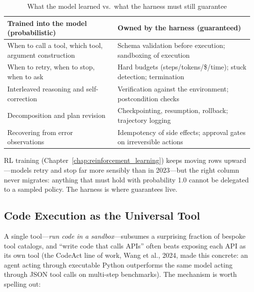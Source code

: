 \begin{table}[H]
\centering
\caption{What the model learned vs.\ what the harness must still guarantee}
\label{tab:model_vs_harness}
\begin{tabularx}{\textwidth}{XX}
\toprule
\textbf{Trained into the model (probabilistic)} & \textbf{Owned by the harness (guaranteed)} \\
\midrule
When to call a tool, which tool, argument construction & Schema validation before execution; sandboxing of execution \\
When to retry, when to stop, when to ask & Hard budgets (steps/tokens/\$/time); stuck detection; termination \\
Interleaved reasoning and self-correction & Verification against the environment; postcondition checks \\
Decomposition and plan revision & Checkpointing, resumption, rollback; trajectory logging \\
Recovering from error observations & Idempotency of side effects; approval gates on irreversible actions \\
\bottomrule
\end{tabularx}
\end{table}

RL training (Chapter~\ref{chap:reinforcement_learning}) keeps moving rows upward---models retry and stop far more sensibly than in 2023---but the right column never migrates: anything that must hold with probability 1.0 cannot be delegated to a sampled policy. The harness is where guarantees live.

\subsection{Code Execution as the Universal Tool}

A single tool---\textit{run code in a sandbox}---subsumes a surprising fraction of bespoke tool catalogs, and ``write code that calls APIs'' often beats exposing each API as its own tool (the CodeAct line of work, Wang et al., 2024, made this concrete: an agent acting through executable Python outperforms the same model acting through JSON tool calls on multi-step benchmarks). The mechanism is worth spelling out:

